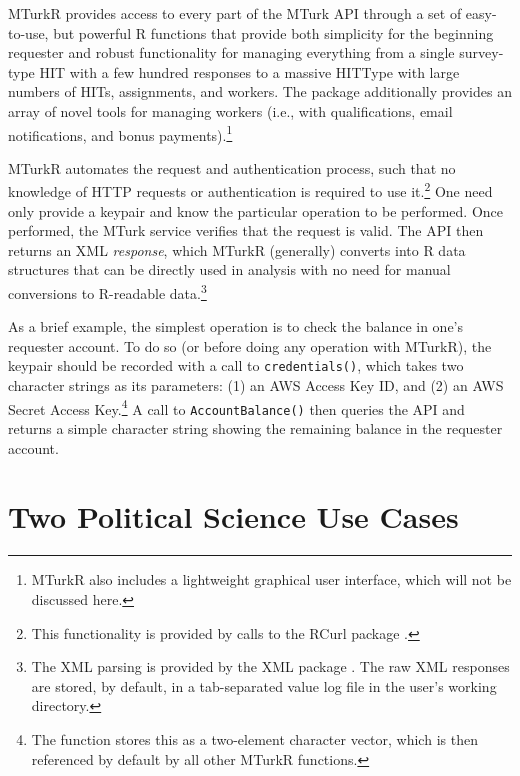 \documentclass[11pt]{article}
\begin{document}
MTurkR provides access to every part of the MTurk API through a set of easy-to-use, but powerful R functions that provide both simplicity for the beginning requester and robust functionality for managing everything from a single survey-type HIT with a few hundred responses to a massive HITType with large numbers of HITs, assignments, and workers. The package additionally provides an array of novel tools for managing workers (i.e., with qualifications, email notifications, and bonus payments).\footnote{MTurkR also includes a lightweight graphical user interface, which will not be discussed here.}

MTurkR automates the request and authentication process, such that no knowledge of HTTP requests or authentication is required to use it.\footnote{This functionality is provided by calls to the RCurl package \citep{Lang2012a}.} One need only provide a keypair and know the particular operation to be performed. Once performed, the MTurk service verifies that the request is valid. The API then returns an XML \emph{response}, which MTurkR (generally) converts into R data structures that can be directly used in analysis with no need for manual conversions to R-readable data.\footnote{The XML parsing is provided by the XML package \citep{Lang2012b}. The raw XML responses are stored, by default, in a tab-separated value log file in the user's working directory.}

As a brief example, the simplest operation is to check the balance in one's requester account. To do so (or before doing any operation with MTurkR), the keypair should be recorded with a call to \verb|credentials()|, which takes two character strings as its parameters: (1) an AWS Access Key ID, and (2) an AWS Secret Access Key.\footnote{The function stores this as a two-element character vector, which is then referenced by default by all other MTurkR functions.} A call to \verb|AccountBalance()| then queries the API and returns a simple character string showing the remaining balance in the requester account.

\section{Two Political Science Use Cases}
\end{document}
